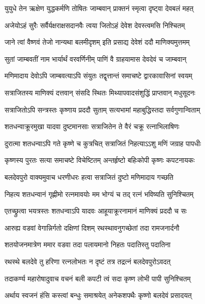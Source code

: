 \twolineshloka
{युयुधे तेन ऋक्षेण युद्धकर्मणि तोषितः}
{जाम्बवान् प्राक्तनं स्मृत्वा दृष्ट्वा देवबलं महत्}%


\twolineshloka
{अजेयोऽहं सुरैः सर्वैर्यक्षराक्षसदानवैः}
{त्वया जितोऽहं देवेश देवस्त्वमसि निश्चितम्}%

\twolineshloka
{जाने त्वां वैष्णवं तेजो नान्यथा बलमीदृशम्}
{इति प्रसाद्य देवेशं ददौ माणिक्यमुत्तमम्}%

\twolineshloka
{सुतां जाम्बवतीं नाम भार्यार्थं वरवर्णिनीम्}
{पाणिं वै ग्राहयामास देवदेवं च जाम्बवान्}%

\twolineshloka
{मणिमादाय देवोऽपि जाम्बवत्याऽपि संयुतः}
{तद्वृत्तान्तं समाचष्टे द्वारकावासिनां स्वयम्}%

\twolineshloka
{सत्राजितस्य माणिक्यं दत्तवान् संसदि स्थितः}
{मिथ्यापवादसंशुद्धिं प्राप्तवान् मधुसूदनः}%

\twolineshloka
{सत्राजितोऽपि सन्त्रस्तः कृष्णाय प्रददौ सुताम्}
{सत्यभामां महाबुद्धिस्तदा सर्वगुणान्विताम्}%

\twolineshloka
{शतधन्वाक्रूरमुखा यादवा दुष्टमानसाः}
{सत्राजितेन ते वैरं चक्रू रत्नाभिलाषिणः}%

\twolineshloka
{दुरात्मा शतधन्वाऽपि गते कृष्णे च कुत्रचित्}
{सत्राजितं निहत्याऽऽशु मणिं जग्राह पापधीः}%

\twolineshloka
{कृष्णस्य पुरतः सत्या समाचष्टे विचेष्टितम्}
{अन्तर्हृष्टो बहिःकोपी कृष्णः कपटनायकः}%

\twolineshloka
{बलदेवपुरो वाक्यमुवाच धरणीधरः}
{हत्वा सत्राजितं दुष्टो मणिमादाय गच्छति}%

\twolineshloka
{निहत्य शतधन्वानं गृह्णीमो रत्नमावयोः}
{मम भोग्यं च तद् रत्नं भविष्यति सुनिश्चितम्}%

\twolineshloka
{एतच्छ्रुत्वा  भयत्रस्तः शतधन्वाऽपि यादवः}
{आहूयाक्रूरनामानं माणिक्यं प्रददौ च सः}%

\twolineshloka
{आरुह्य वडवां वेगान्निर्गतो दक्षिणां दिशम्}
{रथस्थावनुगच्छेतां तदा रामजनार्दनौ}%

\twolineshloka
{शतयोजनमात्रेण ममार वडवा तदा}
{पलायमानो निहतः पदातिस्तु पदातिना}%

\twolineshloka
{रथस्थे बलदेवे तु हरिणा रत्नलोभतः}
{न दृष्टं तत्र तद्रत्नं बलदेवपुरोऽवदत्}%

\twolineshloka
{तदाकर्ण्य महारोषादुवाच वचनं बली}
{कपटी त्वं सदा कृष्ण लोभी पापी सुनिश्चितम्}%

\twolineshloka
{अर्थाय स्वजनं हंसि कस्त्वां बन्धुः समाश्रयेत्}
{अनेकशपथैः कृष्णो बलदेवं प्रसादयत्}%

